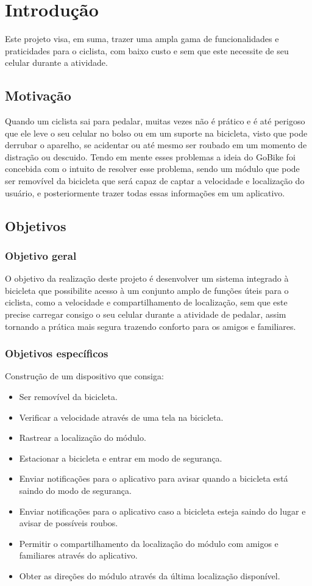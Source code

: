 \chapter{Introdução}
Este projeto visa, em suma, trazer uma ampla gama de funcionalidades e praticidades para o ciclista, com baixo custo e sem que este necessite de seu celular durante a atividade.
\section{Motivação} %
Quando um ciclista sai para pedalar, muitas vezes não é prático e é até perigoso que ele leve o seu celular no bolso ou em um suporte na bicicleta, visto que pode derrubar o aparelho, se acidentar ou até mesmo ser roubado em um momento de distração ou descuido.
Tendo em mente esses problemas a ideia do GoBike foi concebida com o intuito de resolver esse problema, sendo um módulo que pode ser removível da bicicleta que será capaz de captar a velocidade e localização do usuário, e posteriormente trazer todas essas informações em um aplicativo.
\section{Objetivos}
\subsection{Objetivo geral} 
O objetivo da realização deste projeto é desenvolver um sistema integrado à bicicleta que possibilite acesso à um conjunto amplo de funções úteis para o ciclista, como a velocidade e compartilhamento de localização, sem que este precise carregar consigo o seu celular durante a atividade de pedalar, assim tornando a prática mais segura trazendo conforto para os amigos e familiares. 
\subsection{Objetivos específicos}
Construção de um dispositivo que consiga:
\begin{itemize}
  \item Ser removível da bicicleta.
  \item Verificar a velocidade através de uma tela na bicicleta.
  \item Rastrear a localização do módulo.
  \item Estacionar a bicicleta e entrar em modo de segurança.
  \item Enviar notificações para o aplicativo para avisar quando a bicicleta está saindo do modo de segurança.
  \item Enviar notificações para o aplicativo caso a bicicleta esteja saindo do lugar e avisar de possíveis roubos.
  \item Permitir o compartilhamento da localização do módulo com amigos e familiares através do aplicativo.
  \item Obter as direções do módulo através da última localização disponível.
\end{itemize}

